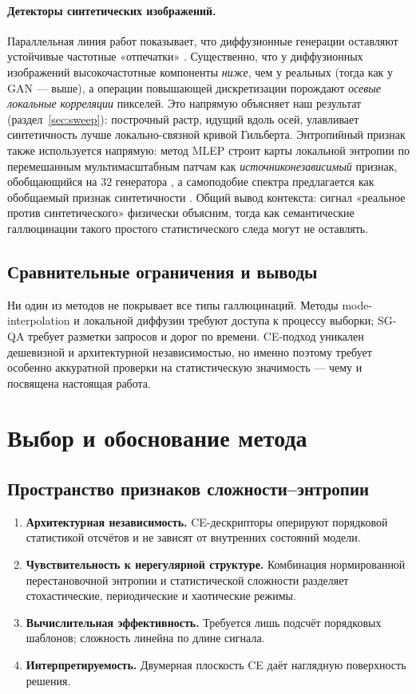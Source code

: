 \documentclass[14pt]{extarticle}
\theoremstyle{plain}
\numberwithin{equation}{section}
\numberwithin{figure}{section}
\numberwithin{table}{section}
\begin{document}
\paragraph{Детекторы синтетических изображений.}
Параллельная линия работ показывает, что диффузионные генерации оставляют
устойчивые частотные «отпечатки» \citep{corvi2023detection,bird2024cifake}.
Существенно, что у диффузионных изображений высокочастотные компоненты
\emph{ниже}, чем у реальных (тогда как у GAN — выше), а операции повышающей
дискретизации порождают \emph{осевые локальные корреляции} пикселей. Это
напрямую объясняет наш результат (раздел~\ref{sec:sweep}): построчный растр,
идущий вдоль осей, улавливает синтетичность лучше локально-связной кривой
Гильберта. Энтропийный признак также используется напрямую: метод MLEP строит
карты локальной энтропии по перемешанным мультимасштабным патчам как
\emph{источниконезависимый} признак, обобщающийся на $32$ генератора
\citep{yuan2025mlep}, а самоподобие спектра предлагается как обобщаемый признак
синтетичности \citep{tan2025fractal}. Общий вывод контекста: сигнал «реальное
против синтетического» физически объясним, тогда как семантические галлюцинации
такого простого статистического следа могут не оставлять.

\subsection{Сравнительные ограничения и выводы}
Ни один из методов не покрывает все типы галлюцинаций. Методы mode-interpolation
и локальной диффузии требуют доступа к процессу выборки; SG-QA требует разметки
запросов и дорог по времени. CE-подход уникален дешевизной и
архитектурной независимостью, но именно поэтому требует особенно аккуратной
проверки на статистическую значимость — чему и посвящена настоящая работа.

\section{Выбор и обоснование метода}\label{sec:method_choice}

\subsection{Пространство признаков сложности–энтропии}
\begin{enumerate}
\item \textbf{Архитектурная независимость.} CE-дескрипторы оперируют порядковой
      статистикой отсчётов и не зависят от внутренних состояний модели.
\item \textbf{Чувствительность к нерегулярной структуре.} Комбинация
      нормированной перестановочной энтропии и статистической сложности
      разделяет стохастические, периодические и хаотические режимы.
\item \textbf{Вычислительная эффективность.} Требуется лишь подсчёт порядковых
      шаблонов; сложность линейна по длине сигнала.
\item \textbf{Интерпретируемость.} Двумерная плоскость CE даёт наглядную
      поверхность решения.
\end{enumerate}
\end{document}
